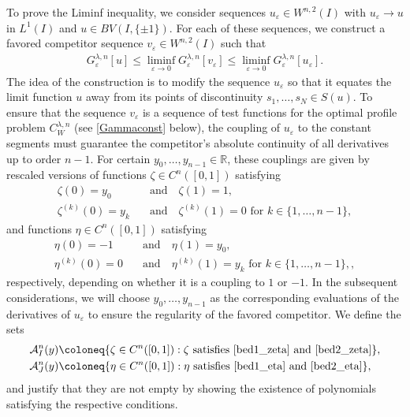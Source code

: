 \documentclass{article}
\newcommand{\lam}{\lambda}
\newcommand{\eps}{\varepsilon}
\numberwithin{figure}{section}
\def\AAA{{\mathcal A}} \def\calB{{\mathcal B}} \def\calC{{\mathcal C}}
\newcommand{\R}{\mathbb{R}}
\numberwithin{equation}{section}
\begin{document}
 To prove the Liminf inequality, we consider sequences $u_\eps \in W^{n,2}(I)$ with $u_\eps \to u$ in $L^1(I)$ and $u \in BV(I,\{\pm1\})$. For each of these sequences, we construct a favored competitor sequence $v_\eps \in W^{n,2}(I)$ such that
\begin{align} \label{competitor}
    G_\eps^{\lam,n}[u] \leq \liminf_{\eps \to 0} G_\eps^{\lam,n}[v_\eps] \leq \liminf_{\eps \to 0} G_\eps^{\lam,n}[u_\eps].
\end{align}
 The idea of the construction is to modify the sequence $u_\eps$ so that it equates the limit function $u$ away from its points of discontinuity $s_1, \ldots , s_N \in S(u)$. To ensure that the sequence $v_\eps$ is a sequence of test functions for the optimal profile problem $C_W^{\lam,n}$ (see \eqref{Gammaconst} below), the coupling of $u_\eps$ to the constant segments must guarantee the competitor's absolute continuity of all derivatives up to order $n-1$. For certain $y_0,\ldots,y_{n-1} \in \R$, these couplings are given by rescaled versions of functions $\zeta \in C^n([0,1])$ satisfying
     \begin{align}
        \zeta(0)=y_0 \quad &\text{and} \quad \zeta(1)=1, \label{bed1_zeta} \\
        \zeta^{(k)}(0)=y_k \quad &\text{and} \quad \zeta^{(k)}(1)=0 \text{ for } k \in \{1,\ldots,n-1\}, \label{bed2_zeta}
     \end{align}
and functions $\eta \in C^n([0,1])$ satisfying
    \begin{align}
        \eta(0)=-1 \quad &\text{and} \quad \eta(1)=y_0, \label{bed1_eta} \\
        \eta^{(k)}(0)=0 \quad &\text{and} \quad \eta^{(k)}(1)=y_k \text{ for } k \in \{1,\ldots,n-1\}, \label{bed2_eta},
     \end{align}
respectively, depending on whether it is a coupling to $1$ or $-1$. In the subsequent considerations, we will choose $y_0,\ldots,y_{n-1}$ as the corresponding evaluations of the derivatives of $u_\eps$ to ensure the regularity of the favored competitor. We define the sets
    \begin{align}
        \AAA^n_I(y)&\coloneq \{\zeta \in C^n([0,1]): \zeta \text{ satisfies \eqref{bed1_zeta} and \eqref{bed2_zeta}}\}, \label{AI}\\
        \AAA^n_J(y)&\coloneq \{\eta \in C^n([0,1]): \eta \text{ satisfies \eqref{bed1_eta} and \eqref{bed2_eta}}\}, \label{AJ}
    \end{align}
and justify that they are not empty by showing the existence of polynomials satisfying the respective conditions.
\end{document}
